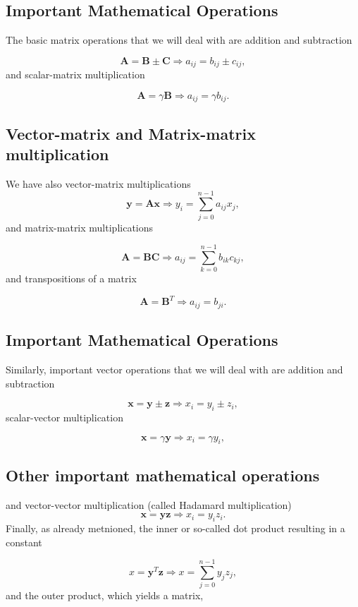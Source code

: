 \subsection{Important Mathematical Operations}

The basic matrix operations that we will deal with are addition and subtraction

\[
\bm{A}= \bm{B}\pm\bm{C}  \Longrightarrow a_{ij} = b_{ij}\pm c_{ij},
\]
and scalar-matrix multiplication

\[
\bm{A}= \gamma\bm{B}  \Longrightarrow a_{ij} = \gamma b_{ij}.
\]

\subsection{Vector-matrix and Matrix-matrix multiplication}

We have also vector-matrix multiplications 
\[
\bm{y}=\bm{Ax}   \Longrightarrow y_{i} = \sum_{j=0}^{n-1} a_{ij}x_j,
\]
and matrix-matrix multiplications

\[
\bm{A}=\bm{BC}   \Longrightarrow a_{ij} = \sum_{k=0}^{n-1} b_{ik}c_{kj},
\]
and transpositions of a matrix

\[
\bm{A}=\bm{B}^T   \Longrightarrow a_{ij} = b_{ji}.
\]

\subsection{Important Mathematical Operations}

Similarly, important vector operations that we will deal with are addition and subtraction

\[
\bm{x}= \bm{y}\pm\bm{z}  \Longrightarrow x_{i} = y_{i}\pm z_{i},
\]
scalar-vector multiplication

\[
\bm{x}= \gamma\bm{y}  \Longrightarrow x_{i} = \gamma y_{i},
\]

\subsection{Other important mathematical operations}
and vector-vector multiplication (called Hadamard multiplication)
\[
\bm{x}=\bm{yz}   \Longrightarrow x_{i} = y_{i}z_i.
\]
Finally, as already metnioned, the inner or so-called dot product  resulting in a constant

\[
x=\bm{y}^T\bm{z}   \Longrightarrow x = \sum_{j=0}^{n-1} y_{j}z_{j},
\]
and the outer product, which yields a matrix,

